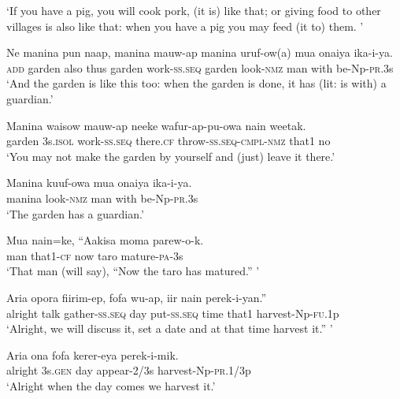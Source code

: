 \glt ‘If you have a pig, you will cook pork, (it is) like that; or giving food to other villages is also like that: when you have a pig you may feed (it to) them. ’ \\
\z


\ea\label{ex:a:x22}
\gll  Ne  manina  pun  naap,  manina  mauw-ap  manina  uruf-ow(a)  mua onaiya  ika-i-ya. \\
\textsc{add}  garden  also  thus  garden  work-\textsc{ss.seq}  garden  look-\textsc{nmz}  man    with  be-Np-\textsc{pr}.3s \\


\glt ‘And the garden is like this too: when the garden is done, it has (lit: is with) a guardian.’ \\
\z


\ea\label{ex:a:x23}
\gll  Manina  waisow  mauw-ap  neeke  wafur-ap-pu-owa          nain  weetak. \\
garden  3s.\textsc{isol}  work-\textsc{ss.seq}  there.\textsc{cf}  throw-\textsc{ss.seq}-\textsc{cmpl}-\textsc{nmz}  that1  no \\


\glt ‘You may not make the garden by yourself and (just) leave it there.’ \\
\z


\ea\label{ex:a:x24}
\gll  Manina  kuuf-owa  mua  onaiya  ika-i-ya. \\
manina  look-\textsc{nmz}  man  with  be-Np-\textsc{pr}.3s \\
\glt ‘The garden has a guardian.’ \\
\z


\ea\label{ex:a:x25}
\gll  Mua  nain=ke,  “Aakisa  moma  parew-o-k. \\
man  that1-\textsc{cf}  now  taro  mature-\textsc{pa}-3s \\
\glt ‘That man (will say), “Now the taro has matured.” ’ \\
\z


\ea\label{ex:a:x26}
\gll  Aria  opora  fiirim-ep,  fofa  wu-ap,  iir  nain  perek-i-yan.” \\
alright  talk  gather-\textsc{ss.seq}  day  put-\textsc{ss.seq}  time  that1  harvest-Np-\textsc{fu}.1p \\
\glt ‘Alright, we will discuss it, set a date and at that time harvest it.” ’ \\
\z


\ea\label{ex:a:x27}
\gll  Aria  ona  fofa  kerer-eya  perek-i-mik. \\
alright  3s.\textsc{gen}  day  appear-2/3s  harvest-Np-\textsc{pr}.1/3p \\
\glt ‘Alright when the day comes we harvest it.’ \\
\z


